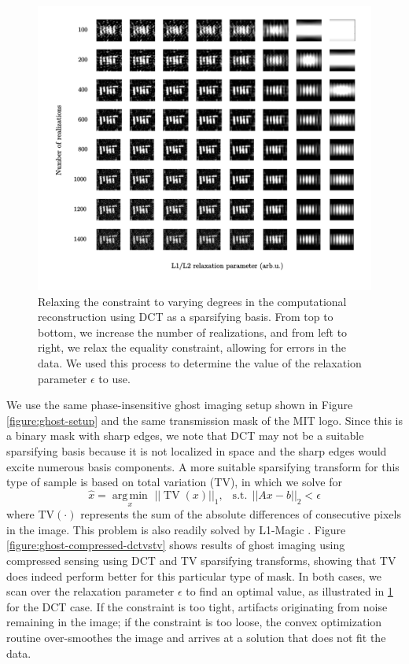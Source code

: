 \begin{figure}[h]
\begin{center}
\includegraphics[width=16cm]{figure-ghost-compressed-tuning.pdf}
\caption{Relaxing the constraint to varying degrees in the computational reconstruction using DCT as a sparsifying basis. From top to bottom, we increase the number of realizations, and from left to right, we relax the equality constraint, allowing for errors in the data. We used this process to determine the value of the relaxation parameter $\epsilon$ to use.}
\label{figure:ghost-compressed-tuning}
\end{center}
\end{figure}

We use the same phase-insensitive ghost imaging setup shown in Figure \ref{figure:ghost-setup} and the same transmission mask of the MIT logo. Since this is a binary mask with sharp edges, we note that DCT may not be a suitable sparsifying basis because it is not localized in space and the sharp edges would excite numerous basis components. A more suitable sparsifying transform for this type of sample is based on total variation (TV), in which we solve for
\begin{equation}
\hat{x} = \underset{x}{\operatorname{arg\,min}}\,\,||\operatorname{TV}\left(x\right)||_1,\,\,\, \operatorname{s.t.}\,||Ax - b||_2<\epsilon
\end{equation}
where TV$\left(\cdot\right)$ represents the sum of the absolute differences of consecutive pixels in the image. This problem is also readily solved by L1-Magic \cite{l1magic}. Figure \ref{figure:ghost-compressed-dctvstv} shows results of ghost imaging using compressed sensing using DCT and TV sparsifying transforms, showing that TV does indeed perform better for this particular type of mask. In both cases, we scan over the relaxation parameter $\epsilon$ to find an optimal value, as illustrated in \ref{figure:ghost-compressed-tuning} for the DCT case. If the constraint is too tight, artifacts originating from noise remaining in the image; if the constraint is too loose, the convex optimization routine over-smoothes the image and arrives at a solution that does not fit the data.

